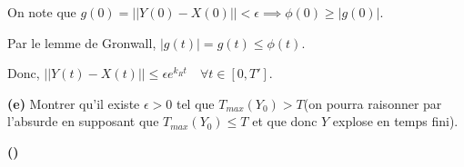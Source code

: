\documentclass[french]{article}
\begin{document}
	On note que $g(0) = ||Y(0) - X(0)|| < \epsilon \implies \phi(0) \geq |g(0)|$.
	
	Par le lemme de Gronwall, $|g(t)| = g(t) \leq \phi(t)$.
	
	Donc, $ || Y(t) - X(t) || \leq \epsilon e^{k_Rt} \quad \forall t \in [0, T']$.
	
	\begin{tcolorbox}[colback=gray!5!white,colframe=gray!75!black]
		\textbf{\large{(e)}} Montrer qu'il existe $\epsilon > 0$ tel que $T_{max}(Y_0) > T$(on pourra raisonner par l'absurde en supposant que $T_{max}(Y_0) \leq T$ et que donc $Y$ explose en temps fini). 
	\end{tcolorbox}
	
	


	\begin{tcolorbox}[colback=gray!5!white,colframe=gray!75!black]
		\textbf{\large{()}} 
	\end{tcolorbox}
\end{document}

